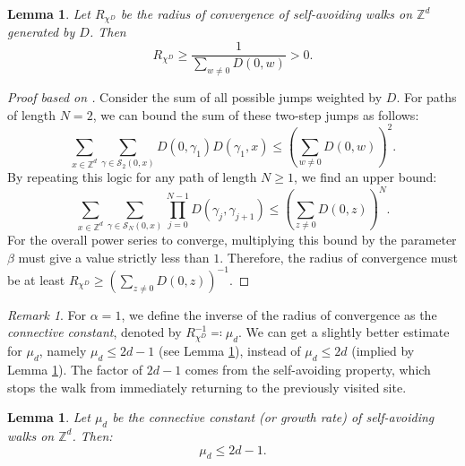 \documentclass[11pt, a4paper, UKenglish, oneside]{book}
\theoremstyle{plain}
\newtheorem{lemma}[theorem]{Lemma}
\theoremstyle{remark}
\newtheorem{remark}[theorem]{Remark}
\theoremstyle{definition}
\numberwithin{equation}{section}
\numberwithin{theorem}{section}
\begin{document}
\begin{lemma}\label{claim:radius}
     Let $R_{\chi^D}$ be the radius of convergence of self-avoiding walks on $\mathbb{Z}^d$ generated by $D$. Then
    \begin{equation*}
    R_{\chi^D} \ge \frac{1}{\sum_{w \neq 0} D(0,w)} > 0.
    \end{equation*}
\end{lemma}
\begin{proof}[Proof based on \cite{disertori2024}]
    Consider the sum of all possible jumps weighted by $D$. For paths of length $N=2$, we can bound the sum of these two-step jumps as follows:
    \begin{equation*}
        \sum_{x \in \mathbb{Z}^d} \sum_{\gamma \in \mathcal{S}_2(0,x)} D(0,\gamma_1)D(\gamma_1,x) \le \left(\sum_{w \neq 0} D(0,w)\right)^2.
    \end{equation*}
    By repeating this logic for any path of length $N \ge 1$, we find an upper bound:
    \begin{equation*}
        \sum_{x \in \mathbb{Z}^d} \sum_{\gamma \in \mathcal{S}_N(0,x)} \prod_{j=0}^{N-1} D(\gamma_j, \gamma_{j+1}) \le \left(\sum_{z \neq 0} D(0,z)\right)^N.
    \end{equation*}
    For the overall power series to converge, multiplying this bound by the parameter $\beta$ must give a value strictly less than $1$. Therefore, the radius of convergence must be at least $R_{\chi^D} \ge \left( \sum_{z \neq 0} D(0,z) \right)^{-1}$.
\end{proof}

\begin{remark}
    For $\alpha=1$, we define the inverse of the radius of convergence as the \textit{connective constant}, denoted by $R_{\chi^D}^{-1} \eqcolon \mu_d$. We can get a slightly better estimate for $\mu_d$, namely $\mu_d \le 2d-1$ (see Lemma \ref{claim:mud}), instead of $\mu_d \le 2d$ (implied by Lemma \ref{claim:radius}). The factor of $2d - 1$ comes from the self-avoiding property, which stops the walk from immediately returning to the previously visited site.
\end{remark}

\begin{lemma}\label{claim:mud}
Let $\mu_d$ be the connective constant (or growth rate) of self-avoiding walks on $\mathbb{Z}^d$. Then:
\[
\mu_d \le 2d - 1.
\]
\end{lemma}
\end{document}
